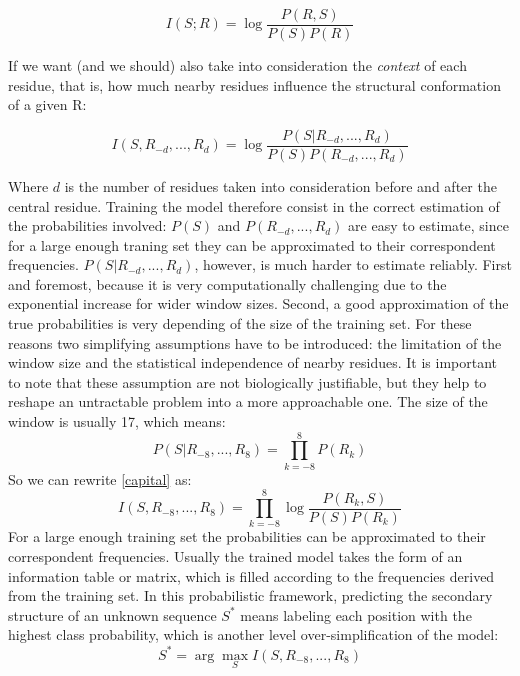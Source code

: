 \documentclass[nocrop]{bioinfo}
\begin{document}
\begin{methods}
\begin{equation}
	I(S;R)=\log\frac{P(R,S)}{P(S)P(R)}
\end{equation}

If we want (and we should) also take into consideration the \textit{context} of each residue, that is, how much nearby residues influence the structural conformation of a given R:

\begin{equation}\label{capital}
	I(S, R_{-d},...,R_{d} ) = \log \frac{P(S|R_{-d},...,R_{d})}{P(S)P(R_{-d},...,R_{d} )}
\end{equation}

Where $d$ is the number of residues taken into consideration before and after the central residue.
Training the model therefore consist in the correct estimation of the probabilities involved:
$P(S)$ and $P(R_{-d},...,R_{d})$ are easy to estimate, since for a large enough traning set they can be approximated to their correspondent frequencies.
$P(S|R_{-d},...,R_{d})$, however, is much harder to estimate reliably. 
First and foremost, because it is very computationally challenging due to the exponential increase for wider window sizes.
Second, a good approximation of the true probabilities is very depending of the size of the training set.
For these reasons two simplifying assumptions have to be introduced: the limitation of the window size and the statistical independence of nearby residues.
It is important to note that these assumption are not biologically justifiable, but they help to reshape an untractable problem into a more approachable one.
The size of the window is usually 17, which means:
\begin{equation}
	P(S|R_{-8},...,R_{8}) = \prod_{k=-8}^{8}P(R_k)
\end{equation}
So we can rewrite \eqref{capital} as:
\begin{equation}
	I(S, R_{-8},...,R_{8} ) = \prod_{k=-8}^{8} \log \frac{P(R_k,S)}{P(S)P(R_k)}
\end{equation}
For a large enough training set the probabilities can be approximated to their correspondent frequencies.
Usually the trained model takes the form of an information table or matrix, which is filled according to the frequencies derived from the training set.
In this probabilistic framework, predicting the secondary structure of an unknown sequence $S^*$ means labeling each position with the highest class probability, which is another level over-simplification of the model:
\begin{equation}
	S^* = \arg \max_S  I(S, R_{-8},...,R_{8} )
\end{equation}


\end{methods}
\end{document}
